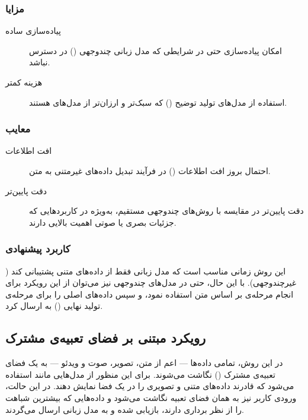 \documentclass{article}
\begin{document}
\subsubsection{مزایا}
\begin{description}
\item[پیاده‌سازی ساده] امکان پیاده‌سازی  حتی در شرایطی که مدل زبانی چندوجهی () در دسترس نباشد.

\item[هزینه کمتر] استفاده از مدل‌های تولید توضیح () که سبک‌تر و ارزان‌تر از مدل‌های  هستند.

\end{description}

\subsubsection{معایب}
\begin{description}
\item[افت اطلاعات] احتمال بروز افت اطلاعات () در فرآیند تبدیل داده‌های غیرمتنی به متن.

\item[دقت پایین‌تر] دقت پایین‌تر در مقایسه با روش‌های چندوجهی مستقیم، به‌ویژه در کاربردهایی که جزئیات بصری یا صوتی اهمیت بالایی دارند.

\end{description}

\subsubsection{کاربرد پیشنهادی}
این روش زمانی مناسب است که مدل زبانی فقط از داده‌های متنی پشتیبانی کند ( غیرچندوجهی).
با این حال، حتی در مدل‌های چندوجهی نیز می‌توان از این رویکرد برای انجام مرحله‌ی  بر اساس متن استفاده نمود،
و سپس داده‌های اصلی را برای مرحله‌ی تولید نهایی () به  ارسال کرد.


\subsection{رویکرد مبتنی بر فضای تعبیه‌ی مشترک }
در این روش، تمامی داده‌ها — اعم از متن، تصویر، صوت و ویدئو — به یک فضای تعبیه‌ی مشترک () نگاشت می‌شوند.
برای این منظور از مدل‌هایی مانند  استفاده می‌شود که قادرند داده‌های متنی و تصویری را در یک فضا نمایش دهند.
در این حالت، ورودی کاربر نیز به همان فضای تعبیه نگاشت می‌شود و داده‌هایی که بیشترین شباهت را از نظر برداری دارند، بازیابی شده و به مدل زبانی ارسال می‌گردند.
\end{document}
